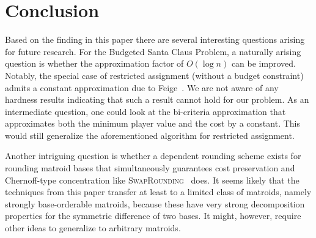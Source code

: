\section{Conclusion}
Based on the finding in this paper there are several interesting questions arising for future research.
For the Budgeted Santa Claus Problem, a naturally arising question is whether the approximation factor of
$O(\log n)$ can be improved. Notably, the special case of restricted assignment (without a budget constraint)
admits a constant approximation due to Feige~\cite{Feige08}.
We are not aware of any hardness
results indicating that such a result cannot hold for our problem. As an intermediate question,
one could look at the bi-criteria approximation that approximates both the minimum player value and the cost by a constant. This would still generalize the aforementioned algorithm for restricted assignment.

Another intriguing question is whether a dependent rounding scheme exists for rounding matroid bases that simultaneously guarantees cost preservation and Chernoff-type concentration 
like \textsc{SwapRounding}~\cite{ChekuriVZ10} does. 
It seems likely that the techniques from this paper
transfer at least to a limited
class of matroids, namely strongly base-orderable
matroids, because
these have very strong decomposition properties for the
symmetric difference of two bases.
It might, however, require other ideas to generalize to
arbitrary matroids.